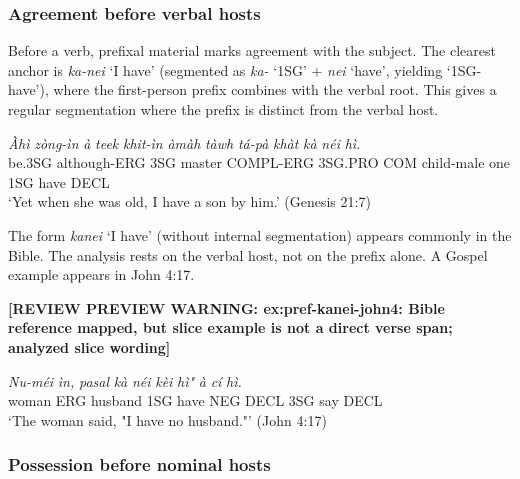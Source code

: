 \documentclass[
  11pt,
  a4paper,
]{article}
\newcommand{\tdim}[1]{\textit{#1}}
\newcommand{\tdimword}[1]{\textit{#1}}
\renewcommand{\textsc}[1]{{\footnotesize\MakeUppercase{#1}}}
\newcommand{\glossquote}[1]{`#1'}
\newcommand{\reviewwarninginline}[1]{\textbf{#1}\par\smallskip}
\begin{document}
\subsubsection{Agreement before verbal
hosts}\label{agreement-before-verbal-hosts}

Before a verb, prefixal material marks agreement with the subject. The
clearest anchor is \tdim{ka-nei} \glossquote{I have} (segmented as
\tdim{ka-} \glossquote{1SG} + \tdim{nei} \glossquote{have}, yielding
\glossquote{1SG-have}), where the first-person prefix combines with the
verbal root. This gives a regular segmentation where the prefix is
distinct from the verbal host.

\begin{exe}
\ex \label{ex:pref-kanei-gen21}
\gll \tdimword{Àhì} \tdimword{zòng-ìn} \tdimword{à} \tdimword{teek} \tdimword{khit-ìn} \tdimword{àmàh} \tdimword{tàwh} \tdimword{tá-pà} \tdimword{khàt} \tdimword{kà} \tdimword{néi} \tdimword{hì.} \\
     be.\textsc{3sg} although-\textsc{erg} \textsc{3sg} master \textsc{compl}-\textsc{erg} \textsc{3sg}.\textsc{pro} \textsc{com} child-male one \textsc{1sg} have \textsc{decl} \\
\glt \glossquote{Yet when she was old, I have a son by him.} (Genesis 21:7)
\end{exe}

The form \tdim{kanei} \glossquote{I have} (without internal
segmentation) appears commonly in the Bible. The analysis rests on the
verbal host, not on the prefix alone. A Gospel example appears in John
4:17.

\begin{exe}
\ex \label{ex:pref-kanei-john4}
\reviewwarninginline{[REVIEW PREVIEW WARNING: ex:pref-kanei-john4: Bible reference mapped, but slice example is not a direct verse span; analyzed slice wording]}
\gll \tdimword{Nu-méi} \tdimword{ìn,} \tdimword{pasal} \tdimword{kà} \tdimword{néi} \tdimword{kèi} \tdimword{hì"} \tdimword{à} \tdimword{cí} \tdimword{hì.} \\
     woman \textsc{erg} husband \textsc{1sg} have \textsc{neg} \textsc{decl} \textsc{3sg} say \textsc{decl} \\
\glt \glossquote{The woman said, "I have no husband."} (John 4:17)
\end{exe}

\subsubsection{Possession before nominal
hosts}\label{possession-before-nominal-hosts}
\end{document}
